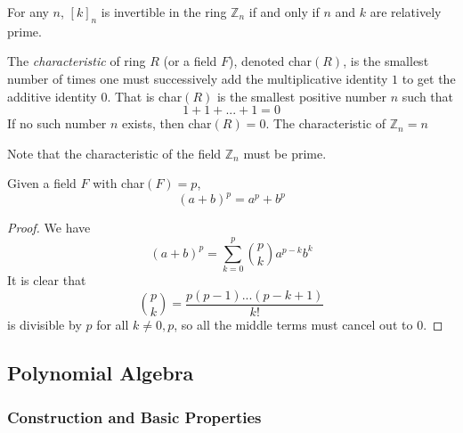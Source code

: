 \documentclass{article}
\begin{document}
    \begin{corollary}
      For any $n$, $[k]_n$ is invertible in the ring $\mathbb{Z}_n$ if and only if $n$ and $k$ are relatively prime. 
    \end{corollary}

    \begin{definition}
      The \textit{characteristic} of ring $R$ (or a field $F$), denoted char$(R)$, is the smallest number of times one must successively add the multiplicative identity $1$ to get the additive identity $0$. That is char$(R)$ is the smallest positive number $n$ such that 
      \begin{equation}
        1 + 1 + ... + 1 = 0 
      \end{equation}
      If no such number $n$ exists, then char$(R) = 0$. The characteristic of $\mathbb{Z}_n = n$
    \end{definition}

    Note that the characteristic of the field $\mathbb{Z}_n$ must be prime. 

    \begin{theorem}
      Given a field $F$ with char$(F) = p$, 
      \begin{equation}
        (a + b)^p = a^p + b^p
      \end{equation}
    \end{theorem}
    \begin{proof}
      We have 
      \begin{equation}
        (a + b)^p = \sum_{k = 0}^p \binom{p}{k} a^{p-k} b^{k}
      \end{equation}
      It is clear that 
      \begin{equation}
        \binom{p}{k} = \frac{p (p-1) ... (p - k+1)}{k!}
      \end{equation}
      is divisible by $p$ for all $k \neq 0, p$, so all the middle terms must cancel out to $0$. 
    \end{proof}

  \subsection{Polynomial Algebra}

    \subsubsection{Construction and Basic Properties}
\end{document}
